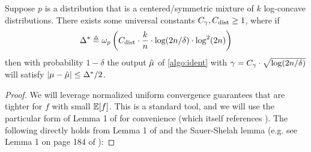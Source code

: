 \begin{theorem}\label{thm:ident-log}
    Suppose $p$ is a distribution that is a centered/symmetric mixture of $k$ log-concave distributions. There exists some universal constants $C_{\gamma},C_{\operatorname{dist}} \ge 1$, 
    where if
    \begin{equation*}
        \Delta^* \triangleq \omega_p \left(C_{\operatorname{dist}} \cdot \frac{k}{n} \cdot \log(2n/\delta) \cdot \log^2(2n) \right)
    \end{equation*}
    then with probability $1-\delta$ the output $\hat{\mu}$ of \cref{algo:ident} with $\gamma = C_{\gamma} \cdot \sqrt{\log(2n/\delta)}$ will satisfy $|\mu - \hat{\mu}| \le \Delta^*/2$.
\end{theorem}
\begin{proof}
We will leverage normalized uniform convergence guarantees that are tighter for $f$ with small $\mathbb{E}[f]$. This is a standard tool, and we will use the particular form of Lemma 1 of \cite{dasgupta2007general} for convenience (which itself references \cite{vapnik2015uniform,bousquet2003introduction}). The following directly holds from Lemma 1 of \cite{dasgupta2007general} and the Sauer-Shelah lemma (e.g. see Lemma 1 on page 184 of \cite{bousquet2003introduction}):


\end{proof}

